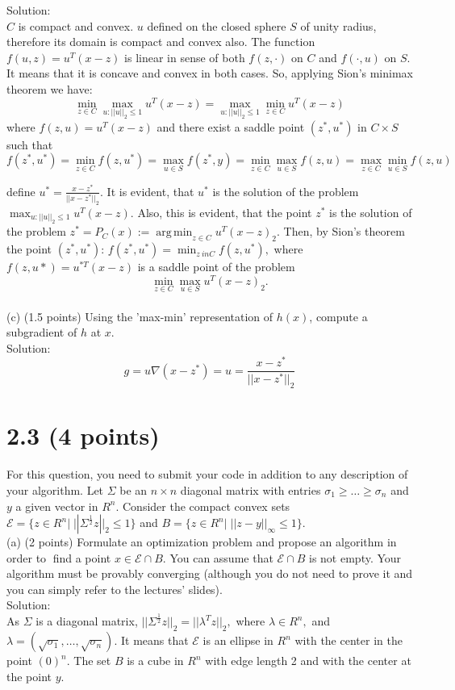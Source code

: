 \documentclass{article}
\begin{document}
Solution: \\
$C$ is compact and convex. $u$ defined on the closed sphere $S$ of unity radius, therefore its domain is compact and convex also. The function $f(u, z) = u^T(x - z)$ is linear 
in sense of both $f(z, \cdot)$ on $C$ and $f(\cdot, u)$ 
on $S.$ It means that it is concave and convex in both cases. So, applying Sion's minimax theorem  we have:\\
$$
\min_{z \in C} \max_{u:||u||_2 \leq 1} u^T(x - z) = 
\max_{u:||u||_2 \leq 1} \min_{z \in C} u^T(x - z)
$$
where ${f(z, u) = u^T(x - z)}$
and there exist a saddle point $(z^*, u^*)$ in $C \times S$
such that 
$$
f(z^*, u^*) = \min_{z \in C} f(z, u^*) = 
\max_{u \in S} f(z^*, y) = \min_{z \in C} \max_{u \in S} f(z, u) = \max_{z \in C} \min_{u \in S}  f(z, u)
$$

define $u^* = \frac{x - z^*}{||x - z^*||_2}.$ It is evident, that $u^*$ is the solution of the problem 
$\max_{u:||u||_2 \leq 1} u^T(x - z).$ Also, this is evident, that the point $z^*$ is the solution of the problem 
${z^* = P_C(x) := \operatorname*{arg\,min}_{z \in C}
	u^T(x - z)_2}.$ 
Then, by Sion's theorem the point 
${(z^*, u^*): \, f(z^*, u^*)} = \min_{z \ in C} f(z, u^*),$
where ${f(z, u*) = u^{*T}(x - z)}$
is a saddle point of the problem 
$$
\min_{z \in C} \max_{u \in S} u^T(x - z)_2.
$$
\\

(c) (1.5 points) Using the 'max-min' representation of $h(x)$, compute a subgradient of $h$ at $x$.
\\

Solution:
$$
g = u \nabla (x - z^*) = u = \frac{x - z^*}{||x - z^*||_2}
$$

\section*{2.3 (4 points)} 

For this question, you need to submit your code in addition to any description
of your algorithm. Let $\Sigma$ be an $n \times n$ diagonal matrix with entries 
$\sigma_1 \geq \dots \geq \sigma_n$ and $y$ a given vector 
in $R^n.$ Consider the compact convex sets 
$\mathcal{E} = \{z \in R^n|\; 
||\Sigma ^{\frac{1}{2} } z||_2 \leq 1\}$
and $B=\{z \in R^n|\; ||z-y||_{\infty} \leq 1 \}.$ \\

(a) (2 points) Formulate an optimization problem and propose an algorithm in order to find a point
$x \in \mathcal{E} \cap B.$ You can assume that $\mathcal{E} \cap B$ is not empty. Your algorithm must be provably converging (although you do not need to prove it and you can simply refer to the lectures' slides).\\

Solution:\\
As $\Sigma$ is a diagonal matrix, 
$||\Sigma ^{\frac{1}{2} } z||_2 = 
||\lambda^T z||_2,$ where $\lambda \in R^n, $ and 
$\lambda = (\sqrt{\sigma_1}, \dots, \sqrt{\sigma_n}).$ It means that $\mathcal{E}$ is an ellipse in $R^n$ with the center in the point $(0)^n$. The set $B $ is a cube in $R^n$ with edge length 2 and with the center at the point $y.$
\end{document}
